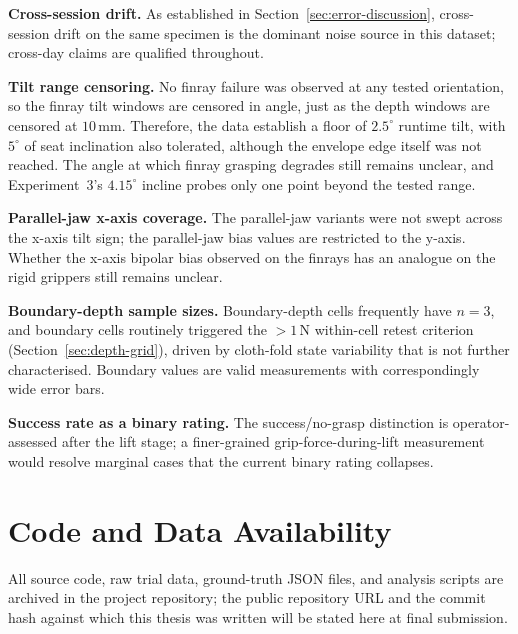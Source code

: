 \textbf{Cross-session drift.} As established in
Section~\ref{sec:error-discussion}, cross-session drift on the
same specimen is the dominant noise source in this dataset; cross-day
claims are qualified throughout.

\textbf{Tilt range censoring.} No finray failure was observed at any
tested orientation, so the finray tilt windows are censored in angle,
just as the depth windows are censored at $10$\,mm. Therefore, the data
establish a floor of $2.5^{\circ}$ runtime tilt, with $5^{\circ}$ of
seat inclination also tolerated, although the envelope edge itself was
not reached. The angle at which finray grasping degrades still remains
unclear, and Experiment~3's $4.15^{\circ}$ incline probes only one point
beyond the tested range.

\textbf{Parallel-jaw x-axis coverage.} The parallel-jaw variants were
not swept across the x-axis tilt sign; the parallel-jaw bias values
are restricted to the y-axis. Whether the x-axis bipolar bias observed
on the finrays has an analogue on the rigid grippers still remains
unclear.

\textbf{Boundary-depth sample sizes.} Boundary-depth cells frequently
have $n=3$, and boundary cells routinely triggered the $>1$\,N
within-cell retest criterion (Section~\ref{sec:depth-grid}), driven by
cloth-fold state variability that is not further characterised.
Boundary values are valid measurements with correspondingly wide
error bars.

\textbf{Success rate as a binary rating.} The success/no-grasp
distinction is operator-assessed after the lift stage; a
finer-grained grip-force-during-lift measurement would resolve
marginal cases that the current binary rating collapses.

\section{Code and Data Availability}

All source code, raw trial data, ground-truth JSON files, and analysis
scripts are archived in the project repository; the public repository
URL and the commit hash against which this thesis was written will be
stated here at final submission. 
